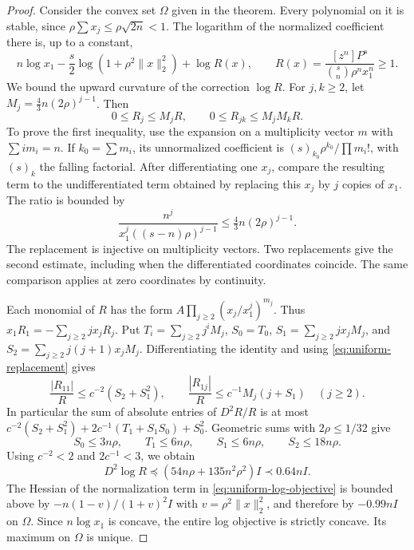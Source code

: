 \documentclass[11pt]{article}
\begin{document}
\begin{proof}
Consider the convex set \(\Omega\) given in the theorem.
Every polynomial on it is stable, since
\(\rho\sum x_j\leq\rho\sqrt{2n}<1\).
The logarithm of the normalized coefficient there is, up
to a constant,
\begin{equation}\label{eq:uniform-log-objective}
 n\log x_1-\frac s2\log(1+\rho^2\|x\|_2^2)+\log R(x),
 \qquad
 R(x)=\frac{[z^n]P^s}{\binom{s}{n}\rho^n x_1^n}\geq1.
\end{equation}
We bound the upward curvature of the correction \(\log R\).
For \(j,k\geq2\), let
\(M_j=\tfrac43 n(2\rho)^{j-1}\). Then
\begin{equation}\label{eq:uniform-replacement}
 0\leq R_j\leq M_jR,\qquad 0\leq R_{jk}\leq M_jM_kR .
\end{equation}
To prove the first inequality, use the expansion on a
multiplicity vector \(m\) with \(\sum i m_i=n\).
If \(k_0=\sum m_i\), its unnormalized coefficient is
\((s)_{k_0}\rho^{k_0}/\prod m_i!\), with \((s)_k\) the
falling factorial. After differentiating one \(x_j\), compare
the resulting term to the undifferentiated term obtained by
replacing this \(x_j\) by \(j\) copies of \(x_1\).
The ratio is bounded by
\[
 \frac{n^j}{x_1^j((s-n)\rho)^{j-1}}
 \leq \tfrac43 n(2\rho)^{j-1}.
\]
The replacement is injective on multiplicity vectors.
Two replacements give the second estimate, including when
the differentiated coordinates coincide. The same comparison
applies at zero coordinates by continuity.

Each monomial of \(R\) has the form
\(A\prod_{j\geq2}(x_j/x_1^j)^{m_j}\). Thus
\(x_1R_1=-\sum_{j\geq2}jx_jR_j\).
Put \(T_i=\sum_{j\geq2}j^iM_j\),
\(S_0=T_0\), \(S_1=\sum_{j\geq2} jx_jM_j\),
and \(S_2=\sum_{j\geq2} j(j+1)x_jM_j\).
Differentiating the identity and using
\eqref{eq:uniform-replacement} gives
\[
 \frac{|R_{11}|}{R}\leq c^{-2}(S_2+S_1^2),\qquad
 \frac{|R_{1j}|}{R}\leq c^{-1}M_j(j+S_1)\quad (j\geq2).
\]
In particular the sum of absolute entries of \(D^2R/R\)
is at most \(c^{-2}(S_2+S_1^2)+2c^{-1}(T_1+S_1S_0)+S_0^2\).
Geometric sums with \(2\rho\leq1/32\) give
\[
 S_0\leq3n\rho,\qquad T_1\leq6n\rho,\qquad
 S_1\leq6n\rho,\qquad S_2\leq18n\rho .
\]
Using \(c^{-2}<2\) and \(2c^{-1}<3\), we obtain
\[
 D^2\log R
 \preceq (54n\rho+135n^2\rho^2)I\prec 0.64n I .
\]
The Hessian of the normalization term in
\eqref{eq:uniform-log-objective} is bounded above by
\(-n(1-v)/(1+v)^2 I\) with \(v=\rho^2\|x\|_2^2\),
and therefore by \(-0.99nI\) on \(\Omega\).
Since \(n\log x_1\) is concave, the entire log objective is
strictly concave. Its maximum on \(\Omega\) is unique.


\end{proof}
\end{document}
